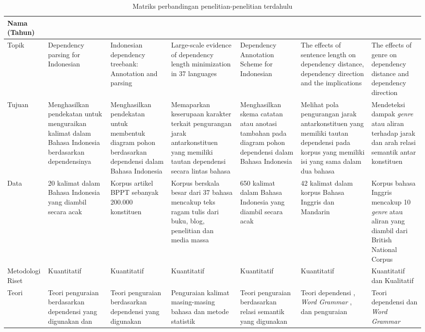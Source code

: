 \pagestyle{empty}
\begin{landscape}
\begin{table}[htbp]
\caption{Matriks perbandingan penelitian-penelitian terdahulu}\label{tab:penelitianterdahulu}
\begin{scriptsize}
\begin{center}
\begin{tabular}{| p{2cm} | p{3cm} | p{3cm} | p{3cm} | p{3cm} | p{3cm} | p{3cm} |}
\hline
Nama (Tahun) & \cite{kamayani2011dependency} & \cite{green2012indonesian} & \cite{futrell2015large} & \cite{irmawati2015dependency} & \cite{jiang2015effects} & \cite{wang2017effects} \\ \hline
Topik & Dependency parsing for Indonesian & Indonesian dependency treebank: Annotation and parsing & Large-scale evidence of dependency length minimization in 37 languages & Dependency Annotation Scheme for Indonesian & The effects of sentence length on dependency distance, dependency direction and the implications & The effects of genre on dependency distance and dependency direction \\ \hline
Tujuan & Menghasilkan pendekatan untuk menguraikan kalimat dalam Bahasa Indonesia berdasarkan dependensinya & Menghasilkan pendekatan untuk membentuk diagram pohon berdasarkan dependensi dalam Bahasa Indonesia & Memaparkan keserupaan karakter terkait pengurangan jarak antarkonstituen yang memiliki tautan dependensi secara lintas bahasa & Menghasilkan skema catatan atau anotasi tambahan pada diagram pohon dependensi dalam Bahasa Indonesia & Melihat pola pengurangan jarak antarkonstituen yang memiliki tautan dependensi pada korpus yang memiliki isi yang sama dalam dua bahasa & Mendeteksi dampak \textit{genre} atau aliran terhadap jarak dan arah relasi semantik antar konstituen \\ \hline
Data & 20 kalimat dalam Bahasa Indonesia yang diambil secara acak & Korpus artikel BPPT sebanyak 200.000 konstituen & Korpus berskala besar dari 37 bahasa mencakup teks ragam tulis dari  buku, blog, penelitian dan media massa & 650 kalimat dalam Bahasa Indonesia yang diambil secara acak & 42 kalimat dalam korpus Bahasa Inggris dan Mandarin & Korpus bahasa Inggris mencakup 10 \textit{genre} atau aliran yang diambil dari British National Corpus \\ \hline
Metodologi Riset & Kuantitatif & Kuantitatif & Kuantitatif & Kuantitatif & Kuantitatif & Kuantitatif dan Kualitatif \\ \hline
Teori & Teori penguraian berdasarkan dependensi yang digunakan \cite{covington2001fundamental} dan \cite{nivre2004incrementality} & Teori penguraian berdasarkan dependensi yang digunakan \cite{nivre2006dependency} & Penguraian kalimat masing-masing bahasa dan metode statistik \cite{gelman2007data} & Teori penguraian berdasarkan relasi semantik yang digunakan \cite{nivre2006dependency} & Teori dependensi \cite{tesniere1959elements}, \textit{Word Grammar} \cite{hudson1984word}, dan penguraian \cite{nivre2006dependency} & Teori dependensi \cite{tesniere1959elements} dan \textit{Word Grammar} \cite{hudson1984word} \\ \hline

\end{tabular}
\end{center}
\end{scriptsize}
\end{table}
\end{landscape}
